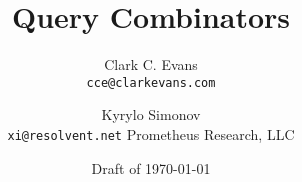\documentclass[9pt,twocolumn,article]{memoir}
\newcommand{\email}[1]{\normalsize{\texttt{#1}}}
\begin{document}
\title{Query Combinators}
\author{
    Clark C. Evans \\ \email{cce@clarkevans.com} \and
    Kyrylo Simonov \\ \email{xi@resolvent.net} \andnext
    Prometheus Research, LLC}
\date{Draft of \today}

\maketitle












\end{document}
